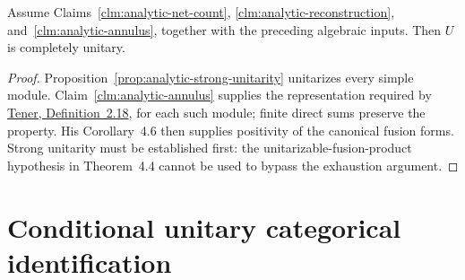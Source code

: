 \begin{theorem}
\label{thm:analytic-complete-unitarity}
Assume Claims~\ref{clm:analytic-net-count},
\ref{clm:analytic-reconstruction}, and~\ref{clm:analytic-annulus},
together with the preceding algebraic inputs.  Then $U$ is completely
unitary.
\end{theorem}
\begin{proof}
Proposition~\ref{prop:analytic-strong-unitarity} unitarizes every simple
module.  Claim~\ref{clm:analytic-annulus} supplies the representation
required by
\href{https://link.springer.com/article/10.1007/s00039-024-00685-8}
{Tener, Definition~2.18}, for each such module; finite direct sums
preserve the property.  His Corollary~4.6 then supplies positivity of
the canonical fusion forms.  Strong unitarity must be established first:
the unitarizable-fusion-product hypothesis in Theorem~4.4 cannot be used
to bypass the exhaustion argument.
\end{proof}

\section{Conditional unitary categorical identification}
\label{sec:analytic-category}


